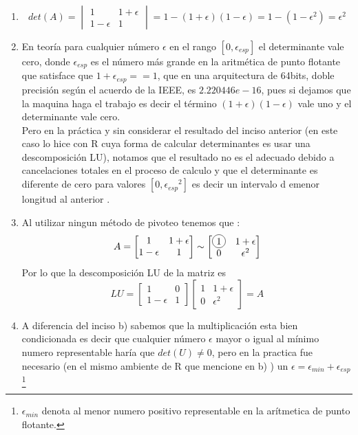 \documentclass[paper=letter, fontsize=11pt]{scrartcl}
\numberwithin{equation}{section} %
\numberwithin{figure}{section} %
\numberwithin{table}{section} %
\newcommand\Circle[1]{%
  \tikz[baseline=(char.base)]\node[circle,draw,inner sep=2pt] (char) {#1};}
\newenvironment{cframed}[1][blue]
  {\begin{tcolorbox}[colframe=#1,colback=white]}
  {\end{tcolorbox}}
\begin{document}
\begin{enumerate}
\begin{cframed}[teal]
\begin{enumerate}
\end{enumerate}
\end{cframed}
\begin{enumerate}
\item \[
det(A)= \begin{vmatrix}
1 & 1+ \epsilon \\
1- \epsilon & 1
\end{vmatrix} = 1-(1+\epsilon)(1-\epsilon) = 1- (1-\epsilon^{2})=\epsilon^2 
\]
\item En teoría para cualquier número $\epsilon$ en el rango $[0,  {\epsilon_{esp}}]$ el determinante vale cero, donde $\epsilon_{esp}$ es el número más grande en la aritmética de punto flotante que satisface que $1+\epsilon_{esp}==1$, que en una arquitectura de 64bits, doble precisión según el acuerdo de la IEEE, es 
$2.220446e-16$, pues si dejamos que la maquina haga el trabajo es decir el término $(1+\epsilon)(1-\epsilon)$ vale uno y el determinante vale cero.\\

Pero en la práctica y sin considerar el resultado del inciso anterior (en este caso lo hice con R cuya forma de calcular determinantes es usar una descomposición LU), notamos que el resultado no es el adecuado debido a cancelaciones totales en el proceso de calculo y que el determinante es diferente de cero para valores $[0,  {\epsilon_{esp}}^2]$ es decir un intervalo d emenor longitud al anterior .


\item Al utilizar ningun método de pivoteo tenemos que :
\[
A =  \begin{bmatrix}
1 & 1+ \epsilon \\
1- \epsilon & 1
\end{bmatrix} \sim  \begin{bmatrix}
				\Circle{1} & 1+ \epsilon   \\
				 0 & \epsilon^2
				\end{bmatrix}  
\]
Por lo que la descomposición LU de la matriz es
\[
LU =  \begin{bmatrix}
1 & 0 \\
1- \epsilon & 1
\end{bmatrix}   \begin{bmatrix}
				1 & 1+ \epsilon   \\
				 0 & \epsilon^2
				\end{bmatrix} =A 
\]

\item A diferencia del inciso b) sabemos que la multiplicación esta bien condicionada es decir que cualquier número $\epsilon$ mayor o igual al mínimo numero representable haría que $det(U)\ne0$, pero en la practica fue necesario (en el mismo ambiente de R que mencione en b) ) un $\epsilon = \epsilon_{min} + \epsilon_{esp}$\footnote{$\epsilon_{min}$ denota al menor numero positivo representable en la arítmetica de punto flotante.}



\end{enumerate}
\end{enumerate}
\end{document}
